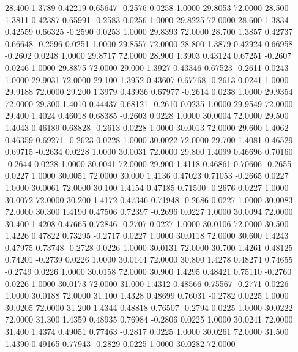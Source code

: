   28.400   1.3789   0.42219   0.65647  -0.2576   0.0258   1.0000  29.8053  72.0000
  28.500   1.3811   0.42387   0.65991  -0.2583   0.0256   1.0000  29.8225  72.0000
  28.600   1.3834   0.42559   0.66325  -0.2590   0.0253   1.0000  29.8393  72.0000
  28.700   1.3857   0.42737   0.66648  -0.2596   0.0251   1.0000  29.8557  72.0000
  28.800   1.3879   0.42924   0.66958  -0.2602   0.0248   1.0000  29.8717  72.0000
  28.900   1.3903   0.43124   0.67251  -0.2607   0.0246   1.0000  29.8875  72.0000
  29.000   1.3927   0.43346   0.67523  -0.2611   0.0243   1.0000  29.9031  72.0000
  29.100   1.3952   0.43607   0.67768  -0.2613   0.0241   1.0000  29.9188  72.0000
  29.200   1.3979   0.43936   0.67977  -0.2614   0.0238   1.0000  29.9354  72.0000
  29.300   1.4010   0.44437   0.68121  -0.2610   0.0235   1.0000  29.9549  72.0000
  29.400   1.4024   0.46018   0.68385  -0.2603   0.0228   1.0000  30.0004  72.0000
  29.500   1.4043   0.46189   0.68828  -0.2613   0.0228   1.0000  30.0013  72.0000
  29.600   1.4062   0.46359   0.69271  -0.2623   0.0228   1.0000  30.0022  72.0000
  29.700   1.4081   0.46529   0.69715  -0.2634   0.0228   1.0000  30.0031  72.0000
  29.800   1.4099   0.46696   0.70160  -0.2644   0.0228   1.0000  30.0041  72.0000
  29.900   1.4118   0.46861   0.70606  -0.2655   0.0227   1.0000  30.0051  72.0000
  30.000   1.4136   0.47023   0.71053  -0.2665   0.0227   1.0000  30.0061  72.0000
  30.100   1.4154   0.47185   0.71500  -0.2676   0.0227   1.0000  30.0072  72.0000
  30.200   1.4172   0.47346   0.71948  -0.2686   0.0227   1.0000  30.0083  72.0000
  30.300   1.4190   0.47506   0.72397  -0.2696   0.0227   1.0000  30.0094  72.0000
  30.400   1.4208   0.47665   0.72846  -0.2707   0.0227   1.0000  30.0106  72.0000
  30.500   1.4226   0.47822   0.73295  -0.2717   0.0227   1.0000  30.0118  72.0000
  30.600   1.4243   0.47975   0.73748  -0.2728   0.0226   1.0000  30.0131  72.0000
  30.700   1.4261   0.48125   0.74201  -0.2739   0.0226   1.0000  30.0144  72.0000
  30.800   1.4278   0.48274   0.74655  -0.2749   0.0226   1.0000  30.0158  72.0000
  30.900   1.4295   0.48421   0.75110  -0.2760   0.0226   1.0000  30.0173  72.0000
  31.000   1.4312   0.48566   0.75567  -0.2771   0.0226   1.0000  30.0188  72.0000
  31.100   1.4328   0.48699   0.76031  -0.2782   0.0225   1.0000  30.0205  72.0000
  31.200   1.4344   0.48818   0.76507  -0.2794   0.0225   1.0000  30.0222  72.0000
  31.300   1.4359   0.48935   0.76984  -0.2806   0.0225   1.0000  30.0241  72.0000
  31.400   1.4374   0.49051   0.77463  -0.2817   0.0225   1.0000  30.0261  72.0000
  31.500   1.4390   0.49165   0.77943  -0.2829   0.0225   1.0000  30.0282  72.0000
